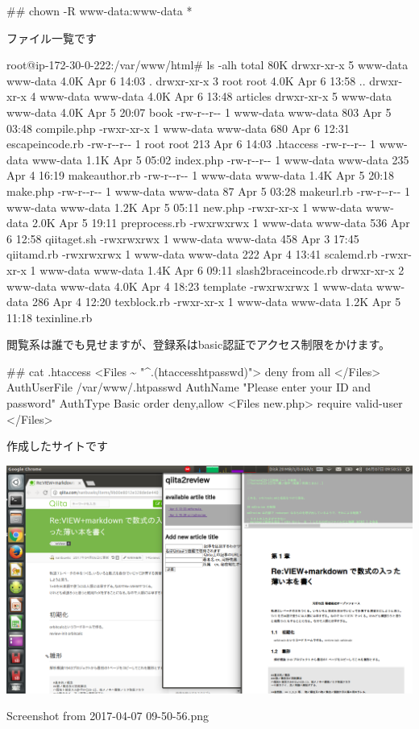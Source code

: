 \begin{reviewemlist}
\#\# chown {-}R www{-}data:www{-}data *

\end{reviewemlist}

ファイル一覧です

\begin{reviewemlist}
root@ip{-}172{-}30{-}0{-}222:/var/www/html\# ls {-}alh
total 80K
drwxr{-}xr{-}x 5 www{-}data www{-}data 4.0K Apr  6 14:03 .
drwxr{-}xr{-}x 3 root     root     4.0K Apr  6 13:58 ..
drwxr{-}xr{-}x 4 www{-}data www{-}data 4.0K Apr  6 13:48 articles
drwxr{-}xr{-}x 5 www{-}data www{-}data 4.0K Apr  5 20:07 book
{-}rw{-}r{-}{-}r{-}{-} 1 www{-}data www{-}data  803 Apr  5 03:48 compile.php
{-}rwxr{-}xr{-}x 1 www{-}data www{-}data  680 Apr  6 12:31 escapeincode.rb
{-}rw{-}r{-}{-}r{-}{-} 1 root     root      213 Apr  6 14:03 .htaccess
{-}rw{-}r{-}{-}r{-}{-} 1 www{-}data www{-}data 1.1K Apr  5 05:02 index.php
{-}rw{-}r{-}{-}r{-}{-} 1 www{-}data www{-}data  235 Apr  4 16:19 makeauthor.rb
{-}rw{-}r{-}{-}r{-}{-} 1 www{-}data www{-}data 1.4K Apr  5 20:18 make.php
{-}rw{-}r{-}{-}r{-}{-} 1 www{-}data www{-}data   87 Apr  5 03:28 makeurl.rb
{-}rw{-}r{-}{-}r{-}{-} 1 www{-}data www{-}data 1.2K Apr  5 05:11 new.php
{-}rwxr{-}xr{-}x 1 www{-}data www{-}data 2.0K Apr  5 19:11 preprocess.rb
{-}rwxrwxrwx 1 www{-}data www{-}data  536 Apr  6 12:58 qiitaget.sh
{-}rwxrwxrwx 1 www{-}data www{-}data  458 Apr  3 17:45 qiitamd.rb
{-}rwxrwxrwx 1 www{-}data www{-}data  222 Apr  4 13:41 scalemd.rb
{-}rwxr{-}xr{-}x 1 www{-}data www{-}data 1.4K Apr  6 09:11 slash2braceincode.rb
drwxr{-}xr{-}x 2 www{-}data www{-}data 4.0K Apr  4 18:23 template
{-}rwxrwxrwx 1 www{-}data www{-}data  286 Apr  4 12:20 texblock.rb
{-}rwxr{-}xr{-}x 1 www{-}data www{-}data 1.2K Apr  5 11:18 texinline.rb
\end{reviewemlist}

閲覧系は誰でも見せますが、登録系はbasic認証でアクセス制限をかけます。

\begin{reviewemlist}
\#\# cat .htaccess
\textless{}Files \textasciitilde{} "\textasciicircum{}\reviewbackslash{}.(htaccess\textbar{}htpasswd)\textdollar{}"\textgreater{}
deny from all
\textless{}/Files\textgreater{}
AuthUserFile /var/www/.htpasswd
AuthName "Please enter your ID and password"
AuthType Basic
order deny,allow
\textless{}Files new.php\textgreater{}
require valid{-}user
\textless{}/Files\textgreater{}
\end{reviewemlist}

作成したサイトです

\begin{reviewimage}
\includegraphics[width=\maxwidth]{./images/7b11276e-74ae-e25a-0872-3726cec353fb.png}
\caption{Screenshot from 2017{-}04{-}07 09{-}50{-}56.png}
\label{image:reviewOnApache:7b11276e-74ae-e25a-0872-3726cec353fb}
\end{reviewimage}

